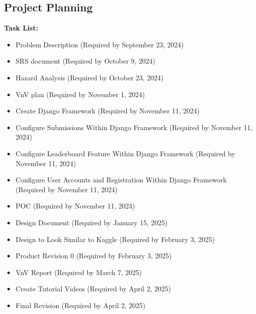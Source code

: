 \documentclass[12pt]{article}
\begin{document}
\subsection{Project Planning}
\textbf{Task List:}
\begin{itemize}
    \item Problem Description (Required by September 23, 2024)
    \item SRS document (Required by October 9, 2024)
    \item Hazard Analysis (Required by October 23, 2024)
    \item VnV plan (Required by November 1, 2024)
    \item Create Django Framework (Required by November 11, 2024)
    \item Configure Submissions Within Django Framework (Required by November 11, 2024)
    \item Configure Leaderboard Feature Within Django Framework (Required by November 11, 2024)
    \item Configure User Accounts and Registration Within Django Framework (Required by November 11, 2024)
    \item POC (Required by November 11, 2024)
    \item Design Document (Required by January 15, 2025)
    \item Design to Look Similar to Kaggle (Required by February 3, 2025)
    \item Product Revision 0 (Required by February 3, 2025)
    \item VnV Report (Required by March 7, 2025)
    \item Create Tutorial Videos (Required by April 2, 2025)
    \item Final Revision (Required by April 2, 2025)
\end{itemize}
\end{document}
